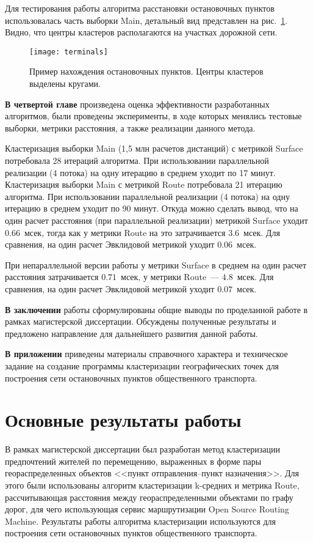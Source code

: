 Для тестирования работы алгоритма расстановки остановочных пунктов использовалась часть выборки Main, детальный вид представлен на рис.~\ref{img:terminals}. Видно, что центры кластеров располагаются на участках дорожной сети.
\begin{figure}[b!]
    \vspace*{-1ex}
    \centering
    \texttt{[image: terminals]}\\[1ex]
    \caption{Пример нахождения остановочных пунктов. Центры кластеров выделены кругами.}
    \label{img:terminals}
    \vspace*{-2em}
\end{figure}

\textbf{В четвертой главе} произведена оценка эффективности разработанных алгоритмов, были проведены эксперименты, в ходе которых менялись тестовые выборки, метрики расстояния, а также реализации данного метода.

Кластеризация выборки Main (1,5 млн расчетов дистанций) с метрикой Surface потребовала 28 итераций алгоритма. При использовании параллельной реализации (4 потока) на одну итерацию в среднем уходит по 17 минут. Кластеризация выборки Main с метрикой Route потребовала 21 итерацию алгоритма. При использовании параллельной реализации (4 потока) на одну итерацию в среднем уходит по 90 минут. Откуда можно сделать вывод, что на один расчет расстояния (при параллельной реализации) метрикой Surface уходит \( 0.66 \)~мсек, тогда как у метрики Route на это затрачивается \( 3.6 \)~мсек. Для сравнения, на один расчет Эвклидовой метрикой уходит \( 0.06 \)~мсек.

При непараллельной версии работы у метрики Surface в среднем на один расчет расстояния затрачивается \( 0.71 \)~мсек, у метрики Route~--- \( 4.8 \)~мсек. Для сравнения, на один расчет Эвклидовой метрикой уходит \( 0.07 \)~мсек.

\textbf{В заключении} работы сформулированы общие выводы по проделанной работе в рамках магистерской диссертации. Обсуждены полученные результаты и предложено направление для дальнейшего развития данной работы.

\textbf{В приложении} приведены материалы справочного характера и техническое задание на создание программы кластеризации географических точек для построения сети остановочных пунктов общественного транспорта.

\section{Основные результаты работы} В рамках магистерской диссертации был разработан метод кластеризации предпочтений жителей по перемещению, выраженных в форме пары геораспределенных объектов <<пункт отправления--пункт назначения>>. Для этого были использованы алгоритм кластеризации k-средних и метрика Route, рассчитывающая расстояния между геораспределенными объектами по графу дорог, для чего использующая сервис маршрутизации Open Source Routing Machine. Результаты работы алгоритма кластеризации используются для построения сети остановочных пунктов общественного транспорта.

